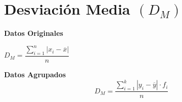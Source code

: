 \section{Desviación Media $(D_M)$}
\begin{multicols}{2}
\textbf{Datos Originales} 
\begin{center}
$D_M = \dfrac{\displaystyle\sum_{i=1}^{n}|x_i-\overline{x}| }{n}$
\end{center}
\columnbreak
\textbf{Datos Agrupados}
$$D_M = \dfrac{\displaystyle\sum_{i=1}^{k}|y_i-\overline{y}|\cdot f_i }{n}$$
\end{multicols}